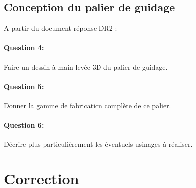 \subsection{Conception du palier de guidage}

A partir du document réponse DR2 :

\paragraph{Question 4:} Faire un dessin à main levée 3D du palier de guidage.

\paragraph{Question 5:} Donner la gamme de fabrication complète de ce palier.

\paragraph{Question 6:} Décrire plus particulièrement les éventuels usinages à réaliser.






\clearpage

\ifdef{\public}{}{}

\newpage

\pagestyle{correction}

\section{Correction}




